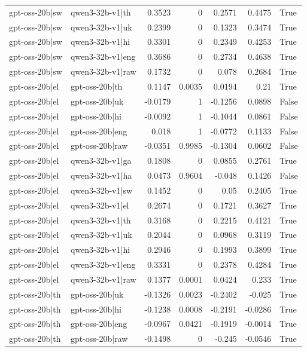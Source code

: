 \begin{table}
\begin{tabular}{l l r r r r l}
gpt-oss-20b|sw & qwen3-32b-v1|th & 0.3523 & 0 & 0.2571 & 0.4475 & True \\
gpt-oss-20b|sw & qwen3-32b-v1|uk & 0.2399 & 0 & 0.1323 & 0.3474 & True \\
gpt-oss-20b|sw & qwen3-32b-v1|hi & 0.3301 & 0 & 0.2349 & 0.4253 & True \\
gpt-oss-20b|sw & qwen3-32b-v1|eng & 0.3686 & 0 & 0.2734 & 0.4638 & True \\
gpt-oss-20b|sw & qwen3-32b-v1|raw & 0.1732 & 0 & 0.078 & 0.2684 & True \\
gpt-oss-20b|el & gpt-oss-20b|th & 0.1147 & 0.0035 & 0.0194 & 0.21 & True \\
gpt-oss-20b|el & gpt-oss-20b|uk & -0.0179 & 1 & -0.1256 & 0.0898 & False \\
gpt-oss-20b|el & gpt-oss-20b|hi & -0.0092 & 1 & -0.1044 & 0.0861 & False \\
gpt-oss-20b|el & gpt-oss-20b|eng & 0.018 & 1 & -0.0772 & 0.1133 & False \\
gpt-oss-20b|el & gpt-oss-20b|raw & -0.0351 & 0.9985 & -0.1304 & 0.0602 & False \\
gpt-oss-20b|el & qwen3-32b-v1|ga & 0.1808 & 0 & 0.0855 & 0.2761 & True \\
gpt-oss-20b|el & qwen3-32b-v1|ha & 0.0473 & 0.9604 & -0.048 & 0.1426 & False \\
gpt-oss-20b|el & qwen3-32b-v1|sw & 0.1452 & 0 & 0.05 & 0.2405 & True \\
gpt-oss-20b|el & qwen3-32b-v1|el & 0.2674 & 0 & 0.1721 & 0.3627 & True \\
gpt-oss-20b|el & qwen3-32b-v1|th & 0.3168 & 0 & 0.2215 & 0.4121 & True \\
gpt-oss-20b|el & qwen3-32b-v1|uk & 0.2044 & 0 & 0.0968 & 0.3119 & True \\
gpt-oss-20b|el & qwen3-32b-v1|hi & 0.2946 & 0 & 0.1993 & 0.3899 & True \\
gpt-oss-20b|el & qwen3-32b-v1|eng & 0.3331 & 0 & 0.2378 & 0.4284 & True \\
gpt-oss-20b|el & qwen3-32b-v1|raw & 0.1377 & 0.0001 & 0.0424 & 0.233 & True \\
gpt-oss-20b|th & gpt-oss-20b|uk & -0.1326 & 0.0023 & -0.2402 & -0.025 & True \\
gpt-oss-20b|th & gpt-oss-20b|hi & -0.1238 & 0.0008 & -0.2191 & -0.0286 & True \\
gpt-oss-20b|th & gpt-oss-20b|eng & -0.0967 & 0.0421 & -0.1919 & -0.0014 & True \\
gpt-oss-20b|th & gpt-oss-20b|raw & -0.1498 & 0 & -0.245 & -0.0546 & True \\

\end{tabular}
\end{table}
